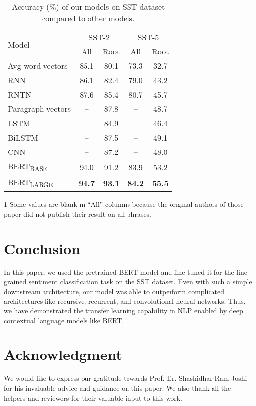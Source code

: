 \documentclass[conference]{IEEEtran}
\begin{document}
\begin{table}
    \renewcommand{\arraystretch}{1.2}
    \begin{center}
    \begin{threeparttable}
    \caption{Accuracy (\%) of our models on SST dataset compared to other models.}
    \label{tab:result}
    \begin{tabular}{p{4cm}cccc}
        \toprule
        \multirow{2}{*}{Model} & \multicolumn{2}{c}{SST-2} & \multicolumn{2}{c}{SST-5}\\
        \cmidrule(lr){2-3}
        \cmidrule(lr){4-5}
        & All & Root & All & Root\\
        \midrule
Avg word vectors\cite{rntn} & 85.1 & 80.1 & 73.3 & 32.7 \\
RNN\cite{rnn-sentiment} & 86.1 & 82.4 & 79.0 & 43.2 \\
        RNTN\cite{rntn} & 87.6 & 85.4 & 80.7 & 45.7 \\
        Paragraph vectors\cite{doc2vec} & -- & 87.8 & -- & 48.7\\
        LSTM\cite{lstm} & -- & 84.9 & -- & 46.4\\
        BiLSTM\cite{lstm} & -- & 87.5 & -- & 49.1\\
        CNN\cite{cnn} & -- & 87.2 & -- & 48.0\\
        \midrule
        BERT\textsubscript{BASE} & 94.0 & 91.2 & 83.9 & 53.2 \\
        BERT\textsubscript{LARGE} & {\bf 94.7} & {\bf 93.1} & {\bf 84.2} & {\bf 55.5} \\
        \bottomrule       
    \end{tabular}
    \begin{tablenotes}
        \item[1] Some values are blank in ``All'' columns because the original authors of those paper did not publish their result on all phrases.
    \end{tablenotes}
    \end{threeparttable}
    \end{center}
\end{table} \section{Conclusion}\label{sec:conclusion}

In this paper, we used the pretrained BERT model and fine-tuned it for the fine-grained sentiment classification task on the SST dataset. Even with such a simple downstream architecture, our model was able to outperform complicated architectures like recursive, recurrent, and convolutional neural networks. Thus, we have demonstrated the transfer learning capability in NLP enabled by deep contextual language models like BERT.
 \section*{Acknowledgment}

We would like to express our gratitude towards Prof. Dr. Shashidhar Ram Joshi for his invaluable advice and guidance on this paper. We also thank all the helpers and reviewers for their valuable input to this work. \balance


\end{document}
